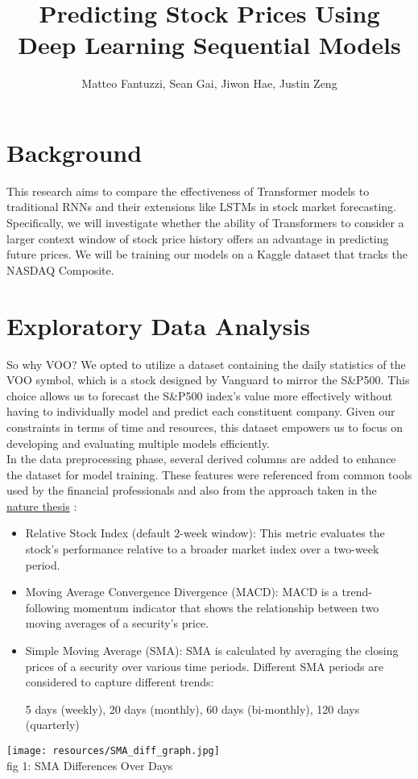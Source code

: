 \documentclass{article}
\title{Predicting Stock Prices Using Deep Learning Sequential Models}
\author{Matteo Fantuzzi, Sean Gai, Jiwon Hae, Justin Zeng}
\date{}
\begin{document}
\maketitle
\section*{Background}
This research aims to compare the effectiveness of Transformer models to traditional RNNs and their extensions like LSTMs in stock market forecasting. Specifically, we will investigate whether the ability of Transformers to consider a larger context window of stock price history offers an advantage in predicting future prices. We will be training our models on a Kaggle dataset that tracks the NASDAQ Composite.

\section*{Exploratory Data Analysis}
So why VOO?
We opted to utilize a dataset containing the daily statistics of the VOO symbol, which is a stock designed by Vanguard to mirror the S&P500. This choice allows us to forecast the S&P500 index's value more effectively without having to individually model and predict each constituent company. Given our constraints in terms of time and resources, this dataset empowers us to focus on developing and evaluating multiple models efficiently. \\

In the data preprocessing phase, several derived columns are added to enhance the dataset for model training. These features were referenced from common tools used by the financial professionals and also from the approach taken in the \href{https://www.nature.com/articles/s41599-024-02807-x}{nature thesis} :
\begin{itemize}
    \item Relative Stock Index (default 2-week window): This metric evaluates the stock's performance relative to a broader market index over a two-week period.

    \item Moving Average Convergence Divergence (MACD): MACD is a trend-following momentum indicator that shows the relationship between two moving averages of a security’s price.

    \item Simple Moving Average (SMA): SMA is calculated by averaging the closing prices of a security over various time periods. Different SMA periods are considered to capture different trends:

    5 days (weekly),
    20 days (monthly),
    60 days (bi-monthly),
    120 days (quarterly)
\end{itemize}
\begin{center}
\texttt{[image: resources/SMA\_diff\_graph.jpg]} \\
    fig 1: SMA Differences Over Days
\end{center}
\end{document}
